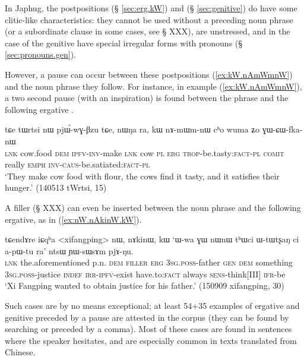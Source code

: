 In Japhug, the postpositions  (§ \ref{sec:erg.kW}) and   (§ \ref{sec:genitive}) do have some clitic-like characteristics: they cannot be used without a preceding noun phrase (or a subordinate clause in some cases, see § XXX), are unstressed, and in the case of the genitive have special irregular forms with pronouns (§ \ref{sec:pronouns.gen}).

However, a pause can occur between these postpositions (\ref{ex:kW.nAmWmnW}) and the noun phrase they follow. For instance, in example (\ref{ex:kW.nAmWmnW}), a two second pause (with an inspiration) is found between the phrase  and the following ergative . 

\begin{exe}
\ex \label{ex:kW.nAmWmnW}
\gll tɕe tɯrtsi nɯ pjɯ́-wɣ-βzu tɕe, nɯŋa ra, kɯ nɤ-mɯm-nɯ cʰo wuma ʑo ɣɯ-ɕɯ-fka-nɯ \\
\textsc{lnk} cow.food \textsc{dem} \textsc{ipfv}-\textsc{inv}-make \textsc{lnk} cow \textsc{pl} \textsc{erg} \textsc{trop}-be.tasty:\textsc{fact}-\textsc{pl} \textsc{comit} really \textsc{emph} \textsc{inv}-\textsc{caus}-be.satiated:\textsc{fact}-\textsc{pl} \\
\glt `They make cow food with flour, the cows find it tasty, and it satisfies their hunger.' (140513 tWrtsi, 15)
\end{exe}

A filler (§ XXX) can even be inserted between the noun phrase and the following ergative, as in (\ref{ex:nW.nAkinW.kW}).

\begin{exe}
\ex \label{ex:nW.nAkinW.kW}
\gll  tɕendɤre iɕqʰa <xifangping> nɯ, nɤkinɯ, kɯ `ɯ-wa ɣɯ nɯnɯ tʰɯci ɯ-tɯtʂaŋ ci a-pɯ-tu ra' ntsɯ ɲɯ-sɯsɤm pjɤ-ŋu. \\
\textsc{lnk} the.aforementioned p.n. \textsc{dem} \textsc{filler} \textsc{erg} \textsc{3sg}.\textsc{poss}-father \textsc{gen} \textsc{dem} something \textsc{3sg}.\textsc{poss}-justice \textsc{indef} \textsc{irr}-\textsc{ipfv}-exist have.to:\textsc{fact} always \textsc{sens}-think[III] \textsc{ifr}-be \\
\glt `Xi Fangping wanted to obtain justice for his father.' (150909 xifangping, 30)
\end{exe}

Such cases are by no means exceptional; at least 54+35 examples of ergative and genitive preceded by a pause are attested in the corpus (they can be found by searching  or   preceded by a comma). Most of these cases are found in sentences where the speaker hesitates, and are especially common in texts translated from Chinese.

